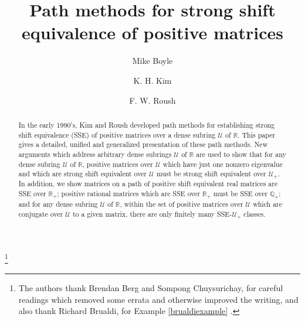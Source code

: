 \documentclass{amsart}
\theoremstyle{definition}
\theoremstyle{remark}
\numberwithin{equation}{section}
\begin{document}
\title{Path methods for strong shift equivalence
of positive matrices}
\author{Mike Boyle}
\address{Mike Boyle\\
Department of Mathematics \\
University of Maryland\\
College Park, MD 20742-4015, U.S.A.}
\author{K. H. Kim}
\address{K. H. Kim  (deceased)\\
Mathematics Research Group\\
Alabama State University, Montgomery, AL 36101-0271, U.S.A.\\
and Korean Academy of Science and Technology}
\author{F. W. Roush}
\address{F. W. Roush\\
Mathematics Research Group\\
Alabama State University, Montgomery, AL 36101-0271, U.S.A.}

\thanks{The authors thank Brendan Berg and Sompong Chuysurichay, 
for careful readings which removed some errata and otherwise 
improved the writing, and  also thank 
Richard Brualdi, for  Example \ref{brualdiexample} .} 

\date{}


 

\begin{abstract} 
In the early 1990's, Kim and Roush developed path methods 
for establishing strong shift equivalence (SSE) of positive 
matrices over a dense subring $\mathcal U$ of $\mathbb R$. 
This paper gives a detailed, unified and generalized 
presentation of these path methods.  
New arguments which address arbitrary dense subrings $\mathcal U$ 
of $\mathbb R$ are 
used to show that for any dense subring $\mathcal U$ of $\mathbb R$, 
positive matrices over $\mathcal U$ which have just 
one nonzero eigenvalue and which are strong shift equivalent over $\mathcal U$ must 
be strong shift equivalent over $\mathcal U_+$. In addition, we show 
matrices on a path of positive shift equivalent real matrices 
are SSE over $\mathbb R_+$;  positive rational matrices 
which are SSE over $\mathbb R_+$ must be 
SSE over $\mathbb Q_+$; and for any  dense subring $\mathcal U$ of 
$\mathbb R$, within the set of positive matrices over $\mathcal U$ 
which are conjugate over $\mathcal U$ to a given matrix, there 
are only finitely many SSE-$\mathcal U_+$ classes. 
\end{abstract}
\maketitle
\tableofcontents
\end{document}
